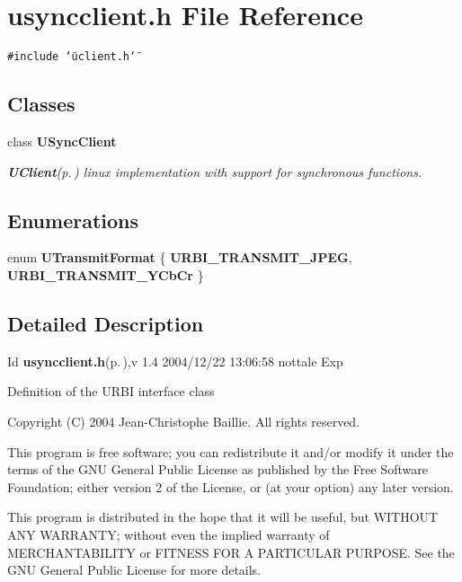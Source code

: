 \section{usyncclient.h File Reference}
\label{usyncclient_8h}
{\tt \#include \char`\"{}uclient.h\char`\"{}}\par
\subsection*{Classes}
\begin{CompactItemize}
\item 
class {\bf USync\-Client}
\begin{CompactList}\small\item\em {\bf UClient}{\rm (p.\,\pageref{classUClient})} linux implementation with support for synchronous functions. \item\end{CompactList}\end{CompactItemize}
\subsection*{Enumerations}
\begin{CompactItemize}
\item 
enum {\bf UTransmit\-Format} \{ {\bf URBI\_\-TRANSMIT\_\-JPEG}, 
{\bf URBI\_\-TRANSMIT\_\-YCb\-Cr}
 \}
\end{CompactItemize}


\subsection{Detailed Description}
\begin{Desc}
\item[Id]{\bf usyncclient.h}{\rm (p.\,\pageref{usyncclient_8h})},v 1.4 2004/12/22 13:06:58 nottale Exp \end{Desc}


Definition of the URBI interface class

Copyright (C) 2004 Jean-Christophe Baillie. All rights reserved.

This program is free software; you can redistribute it and/or modify it under the terms of the GNU General Public License as published by the Free Software Foundation; either version 2 of the License, or (at your option) any later version.

This program is distributed in the hope that it will be useful, but WITHOUT ANY WARRANTY; without even the implied warranty of MERCHANTABILITY or FITNESS FOR A PARTICULAR PURPOSE. See the GNU General Public License for more details.

